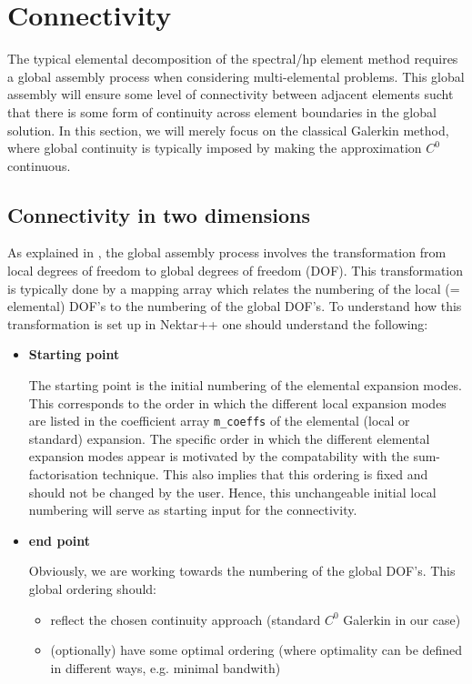 \section{Connectivity}
The typical elemental decomposition of the spectral/hp element method requires a
global assembly process when considering multi-elemental problems. This global
assembly will ensure some level of connectivity between adjacent elements sucht
that there is some form of continuity across element boundaries in the global
solution. In this section, we will merely focus on the classical Galerkin
method, where global continuity is typically imposed by making the approximation
$C^0$ continuous.

\subsection{Connectivity in two dimensions}

As explained in \cite{KaSh05}, the global assembly process involves the
transformation from local degrees of freedom to global degrees of freedom
(DOF). This transformation is typically done by a mapping array which relates
the numbering of the local (= elemental) DOF's to the numbering of the global
DOF's. To understand how this transformation is set up in Nektar++ one should
understand the following:
\begin{itemize}
\item \textbf{Starting point}

   The starting point is the initial numbering of the elemental expansion modes.
   This corresponds to the order in which the different local expansion modes
   are listed in the coefficient array \texttt{m\_coeffs} of the elemental
   (local or standard) expansion. The specific order in which the different elemental
   expansion modes appear is motivated by the compatability with the
   sum-factorisation technique. This also implies that this ordering is fixed
   and should not be changed by the user. Hence, this unchangeable initial local
   numbering will serve as starting input for the connectivity.

\item \textbf{end point}

  Obviously, we are working towards the numbering of the global DOF's. This
  global ordering should:
  \begin{itemize}
  \item reflect the chosen continuity approach (standard $C^0$ Galerkin in our case) 
  \item (optionally) have some optimal ordering (where optimality can
   be defined in different ways, e.g. minimal bandwith)
  \end{itemize}
\end{itemize}


